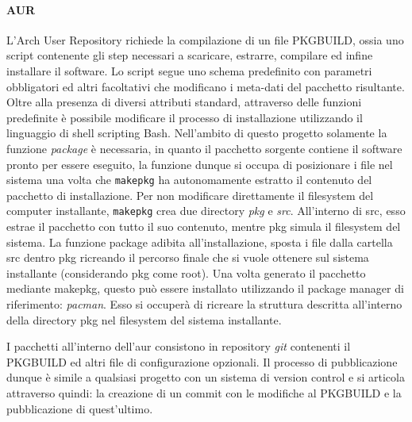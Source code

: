 \paragraph{AUR} L'Arch User Repository richiede la compilazione di un file PKGBUILD, ossia uno script contenente gli step necessari a scaricare, estrarre, compilare ed infine installare il software. Lo script segue uno schema predefinito con parametri obbligatori ed altri facoltativi che modificano i meta-dati del pacchetto risultante. Oltre alla presenza di diversi attributi standard, attraverso delle funzioni predefinite è possibile modificare il processo di installazione utilizzando il linguaggio di shell scripting Bash.
Nell'ambito di questo progetto solamente la funzione \textit{package} è necessaria, in quanto il pacchetto sorgente contiene il software pronto per essere eseguito, la funzione dunque si occupa di posizionare i file nel sistema una volta che \texttt{makepkg} ha autonomamente estratto il contenuto del pacchetto di installazione. Per non modificare direttamente il filesystem del computer installante, \texttt{makepkg} crea due directory \textit{pkg} e \textit{src}. All'interno di src, esso estrae il pacchetto con tutto il suo contenuto, mentre pkg simula il filesystem del sistema. La funzione package adibita all'installazione, sposta i file dalla cartella src dentro pkg ricreando il percorso finale che si vuole ottenere sul sistema installante (considerando pkg come root). Una volta generato il pacchetto mediante makepkg, questo può essere installato utilizzando il package manager di riferimento: \textit{pacman}. Esso si occuperà di ricreare la struttura descritta all'interno della directory pkg nel filesystem del sistema installante.

I pacchetti all'interno dell'\ac{aur} consistono in repository \textit{git} contenenti il PKGBUILD ed altri file di configurazione opzionali. Il processo di pubblicazione dunque è simile a qualsiasi progetto con un sistema di version control e si articola attraverso quindi: la creazione di un commit con le modifiche al PKGBUILD e la pubblicazione di quest'ultimo.


